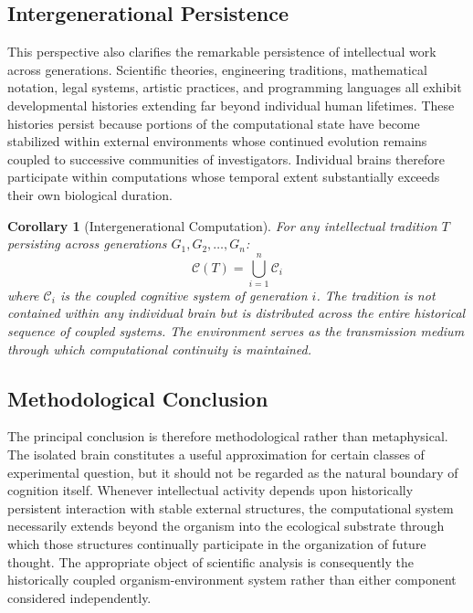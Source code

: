\documentclass[12pt,oneside]{article}
\newtheorem{corollary}[definition]{Corollary}
\theoremstyle{remark}
\begin{document}
\subsection{Intergenerational Persistence}

This perspective also clarifies the remarkable persistence of intellectual work across generations. Scientific theories, engineering traditions, mathematical notation, legal systems, artistic practices, and programming languages all exhibit developmental histories extending far beyond individual human lifetimes. These histories persist because portions of the computational state have become stabilized within external environments whose continued evolution remains coupled to successive communities of investigators. Individual brains therefore participate within computations whose temporal extent substantially exceeds their own biological duration.

\begin{corollary}[Intergenerational Computation]
For any intellectual tradition \(T\) persisting across generations \(G_1, G_2, \ldots, G_n\):
\[
\mathcal{C}(T) = \bigcup_{i=1}^{n} \mathcal{C}_i
\]
where \(\mathcal{C}_i\) is the coupled cognitive system of generation \(i\). The tradition is not contained within any individual brain but is distributed across the entire historical sequence of coupled systems. The environment serves as the transmission medium through which computational continuity is maintained.
\end{corollary}

\subsection{Methodological Conclusion}

The principal conclusion is therefore methodological rather than metaphysical. The isolated brain constitutes a useful approximation for certain classes of experimental question, but it should not be regarded as the natural boundary of cognition itself. Whenever intellectual activity depends upon historically persistent interaction with stable external structures, the computational system necessarily extends beyond the organism into the ecological substrate through which those structures continually participate in the organization of future thought. The appropriate object of scientific analysis is consequently the historically coupled organism-environment system rather than either component considered independently.
\end{document}
